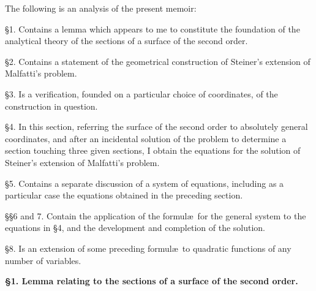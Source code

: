 \documentclass[11pt,a4paper]{book}
\begin{document}
The following is an analysis of the present memoir:

\S 1. Contains a lemma which appears to me to constitute the foundation of the analytical theory of the sections of a surface of the second order.

\S 2. Contains a statement of the geometrical construction of Steiner's extension of Malfatti's problem.

\S 3. Is a verification, founded on a particular choice of coordinates, of the construction in question.

\S 4. In this section, referring the surface of the second order to absolutely general coordinates, and after an incidental solution of the problem to determine a section touching three given sections, I obtain the equations for the solution of Steiner's extension of Malfatti's problem.

\S 5. Contains a separate discussion of a system of equations, including as a particular case the equations obtained in the preceding section.

\S\S 6 and 7. Contain the application of the formul\ae\ for the general system to the equations in \S 4, and the development and completion of the solution.

\S 8. Is an extension of some preceding formul\ae\ to quadratic functions of any number of variables.

\vspace{0.5em}
\noindent\textbf{\S 1. Lemma relating to the sections of a surface of the second order.}
\end{document}
